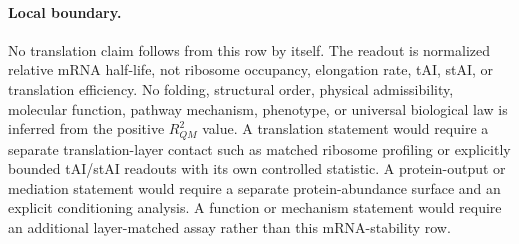 \paragraph{Local boundary.}
No translation claim follows from this row by itself.  The readout is normalized relative mRNA half-life, not ribosome occupancy, elongation rate, tAI, stAI, or translation efficiency.  No folding, structural order, physical admissibility, molecular function, pathway mechanism, phenotype, or universal biological law is inferred from the positive $R^2_{QM}$ value.  A translation statement would require a separate translation-layer contact such as matched ribosome profiling or explicitly bounded tAI/stAI readouts with its own controlled statistic.  A protein-output or mediation statement would require a separate protein-abundance surface and an explicit conditioning analysis.  A function or mechanism statement would require an additional layer-matched assay rather than this mRNA-stability row.